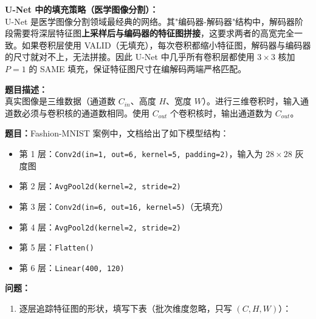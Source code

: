 \documentclass[a4paper,11pt]{ctexart}
\begin{document}
\begin{appbox}[现实应用场景]
    \textbf{U-Net 中的填充策略（医学图像分割）：}\\
    U-Net 是医学图像分割领域最经典的网络。其"编码器-解码器"结构中，解码器阶段需要将深层特征图\textbf{上采样后与编码器的特征图拼接}，这要求两者的高宽完全一致。如果卷积层使用 VALID（无填充），每次卷积都缩小特征图，解码器与编码器的尺寸就对不上，无法拼接。因此 U-Net 中几乎所有卷积层都使用 $3\times3$ 核加 $P=1$ 的 SAME 填充，保证特征图尺寸在编解码两端严格匹配。
\end{appbox}


\begin{problembox}
    \textbf{题目描述：}\\
    真实图像是三维数据（通道数 $C_{in}$、高度 $H$、宽度 $W$）。进行三维卷积时，输入通道数必须与卷积核的通道数相同。使用 $C_{out}$ 个卷积核时，输出通道数为 $C_{out}$。

    \vspace{0.2cm}
    \textbf{题目：}Fashion-MNIST 案例中，文档给出了如下模型结构：
    \begin{itemize}
        \item 第 1 层：\texttt{Conv2d(in=1, out=6, kernel=5, padding=2)}，输入为 $28 \times 28$ 灰度图
        \item 第 2 层：\texttt{AvgPool2d(kernel=2, stride=2)}
        \item 第 3 层：\texttt{Conv2d(in=6, out=16, kernel=5)}（无填充）
        \item 第 4 层：\texttt{AvgPool2d(kernel=2, stride=2)}
        \item 第 5 层：\texttt{Flatten()}
        \item 第 6 层：\texttt{Linear(400, 120)}
    \end{itemize}

    \vspace{0.2cm}
    \textbf{问题：}
    \begin{enumerate}[(1)]
        \item 逐层追踪特征图的形状，填写下表（批次维度忽略，只写 $(C, H, W)$）：


\end{enumerate}
\end{problembox}
\end{document}
